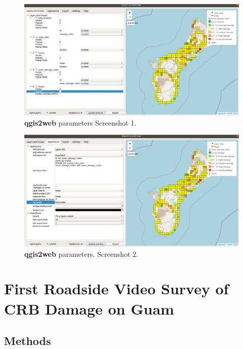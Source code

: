 \documentclass[12pt,letterpaper,english,bibliography=totocnumbered, abstract=on]{scrartcl}
\begin{document}


%

\begin{figure}[H]
	\centering
	\includegraphics[width=\linewidth]{images/qgis2web1.png}
	\caption{\textbf{qgis2web} parameters Screenshot 1.}
	\label{fig:qgis2web1}
\end{figure}

\begin{figure}[H]
	\centering
	\includegraphics[width=\linewidth]{images/qgis2web2.png}
	\caption{\textbf{qgis2web} parameters. Screenshot 2.}
	\label{fig:qgis2web2}
\end{figure}


\section{First Roadside Video Survey of CRB Damage on Guam}

\subsection{Methods}
\end{document}
